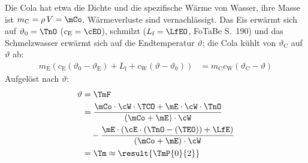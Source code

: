 Die Cola hat etwa die Dichte und die spezifische Wärme von Wasser, ihre Masse ist $m_\text{C} = \rho\,V = \mCo$. Wärmeverluste sind vernachlässigt. Das Eis erwärmt sich auf $\vartheta_0 = \TnO$ ($c_\text{E} = \cEO$), schmilzt ($L_\text{f} = \LfEO$, FoTaBe S.~190) und das Schmelzwasser erwärmt sich auf die Endtemperatur $\vartheta$; die Cola kühlt von $\vartheta_\text{C}$ auf $\vartheta$ ab:
\begin{align}
 m_\text{E}\left(c_\text{E}\left(\vartheta_0-\vartheta_\text{E}\right)+L_\text{f}+c_\text{W}\left(\vartheta-\vartheta_0\right)\right) &= m_\text{C}c_\text{W}\left(\vartheta_\text{C}-\vartheta\right)
\end{align}
Aufgelöst nach $\vartheta$:
\begin{align}
 \vartheta &= \TmF \\
   &= \frac{\mCo\cdot\cW\cdot\TCO+\mE\cdot\cW\cdot\TnO}{\left(\mCo+\mE\right)\cdot\cW} \\
   &\quad -\frac{\mE\cdot\left(\cE\cdot\left(\TnO-\left(\TEO\right)\right)+\LfE\right)}{\left(\mCo+\mE\right)\cdot\cW} \\
   &= \Tm \approx \result{\TmP{0}{2}}
\end{align}
